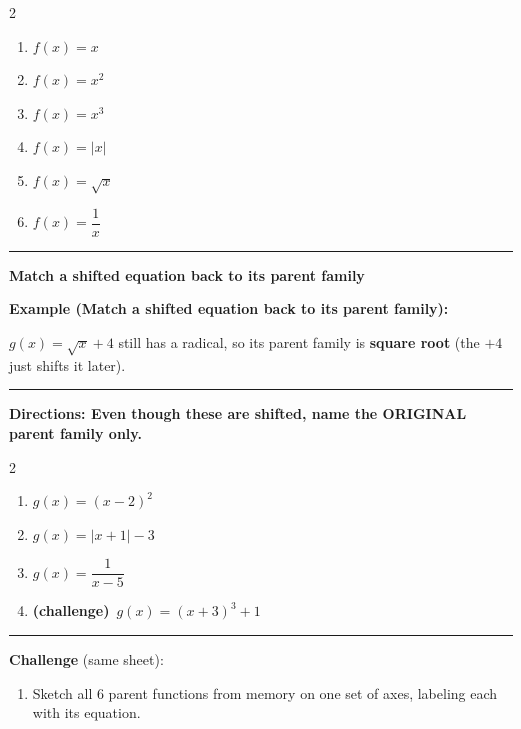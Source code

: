 \documentclass[12pt]{article}
\begin{document}
\begin{multicols}{2}
\begin{enumerate}[label=\textbf{\arabic*.}, start=1, itemsep=2cm]
  \item $\displaystyle f(x)=x$
  \item $\displaystyle f(x)=x^{2}$
  \item $\displaystyle f(x)=x^{3}$
  \item $\displaystyle f(x)=|x|$
  \item $\displaystyle f(x)=\sqrt{x}$
  \item $\displaystyle f(x)=\dfrac{1}{x}$
\end{enumerate}
\end{multicols}
\vspace{0.25cm}\hrule\vspace{0.35cm}

\begin{center}{\Large \textbf{Match a shifted equation back to its parent family}}\end{center}\vspace{0.2cm}
\textbf{Example (Match a shifted equation back to its parent family):}

$g(x)=\sqrt{x}+4$ still has a radical, so its parent family is \textbf{square root} (the $+4$ just shifts it later).

\vspace{0.2cm}\hrule\vspace{0.35cm}
\textbf{Directions: Even though these are shifted, name the ORIGINAL parent family only.}

\begin{multicols}{2}
\begin{enumerate}[label=\textbf{\arabic*.}, start=7, itemsep=1.3cm]
  \item $\displaystyle g(x)=(x-2)^{2}$
  \item $\displaystyle g(x)=|x+1|-3$
  \item $\displaystyle g(x)=\dfrac{1}{x-5}$
  \item \textbf{(challenge)}\ $\displaystyle g(x)=(x+3)^{3}+1$
\end{enumerate}
\end{multicols}

\vspace{0.2cm}\hrule\vspace{0.3cm}
\textbf{Challenge} (same sheet):\\[4pt]
\begin{enumerate}[label=\textbf{\arabic*.}, start=11, itemsep=2.2cm]
  \item Sketch all 6 parent functions from memory on one set of axes, labeling each with its equation.
\end{enumerate}
\end{document}
